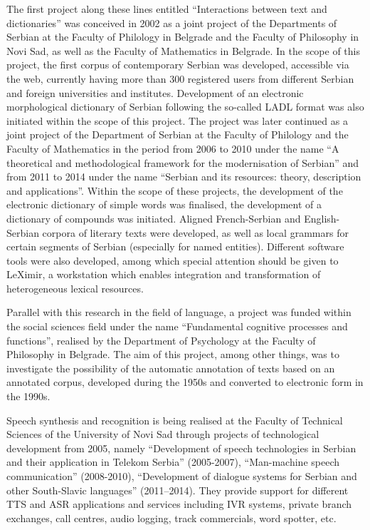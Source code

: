 \begin{multicols}{2}
The first project along these lines entitled “Interactions between text and dictionaries” was conceived in 2002 as a joint project of the Departments of Serbian at the Faculty of Philology in Belgrade and the Faculty of Philosophy in Novi Sad, as well as the Faculty of Mathematics in Belgrade. In the scope of this project, the first corpus of contemporary Serbian was developed, \cite{KORPUS} accessible via the web, currently having more than 300 registered users from different Serbian and foreign universities and institutes. Development of an electronic morphological dictionary of Serbian following the so-called LADL format was also initiated within the scope of this project. \cite{KRSTEV} The project was later continued as a joint project of the Department of Serbian at the Faculty of Philology and the Faculty of Mathematics in the period from 2006 to 2010 under the name “A theoretical and methodological framework for the modernisation of Serbian” and from 2011 to 2014 under the name “Serbian and its resources: theory, description and applications”. Within the scope of these projects, the development of the electronic dictionary of simple words was finalised, the development of a dictionary of compounds was initiated. Aligned French-Serbian and English-Serbian corpora of literary texts were developed, as well as local grammars for certain segments of Serbian (especially for named entities). Different software tools were also developed, among which special attention should be given to LeXimir, a workstation which enables integration and transformation of heterogeneous lexical resources.
 
Parallel with this research in the field of language, a project was funded within the social sciences field under the name “Fundamental cognitive processes and functions”, realised by the Department of Psychology at the Faculty of Philosophy in Belgrade. The aim of this project, among other things, was to investigate the possibility of the automatic annotation of texts based on an annotated corpus, \cite{SRB_KORPUS} developed during the 1950s and converted to electronic form in the 1990s. 

Speech synthesis and recognition is being realised at the Faculty of Technical Sciences of the University of Novi Sad through projects of technological development from 2005, namely “Development of speech technologies in Serbian and their application in Telekom Serbia” (2005-2007), “Man-machine speech communication” (2008-2010), “Development of dialogue systems for Serbian and other South-Slavic languages” (2011--2014). They provide support for different TTS and ASR applications and services including IVR systems, private branch exchanges, call centres, audio logging, track commercials, word spotter, etc.
 

\end{multicols}
